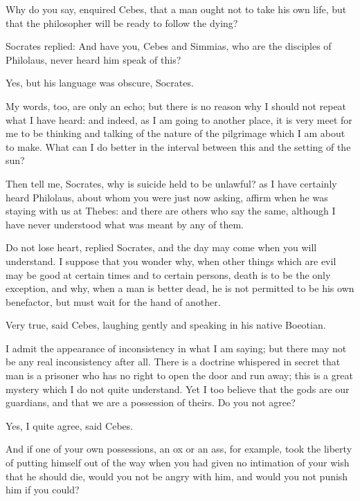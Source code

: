 \documentclass[11pt,letter]{article}
\begin{document}
\par  Why do you say, enquired Cebes, that a man ought not to take his own life, but that the philosopher will be ready to follow the dying?

\par  Socrates replied: And have you, Cebes and Simmias, who are the disciples of Philolaus, never heard him speak of this?

\par  Yes, but his language was obscure, Socrates.

\par  My words, too, are only an echo; but there is no reason why I should not repeat what I have heard: and indeed, as I am going to another place, it is very meet for me to be thinking and talking of the nature of the pilgrimage which I am about to make. What can I do better in the interval between this and the setting of the sun?

\par  Then tell me, Socrates, why is suicide held to be unlawful? as I have certainly heard Philolaus, about whom you were just now asking, affirm when he was staying with us at Thebes: and there are others who say the same, although I have never understood what was meant by any of them.

\par  Do not lose heart, replied Socrates, and the day may come when you will understand. I suppose that you wonder why, when other things which are evil may be good at certain times and to certain persons, death is to be the only exception, and why, when a man is better dead, he is not permitted to be his own benefactor, but must wait for the hand of another.

\par  Very true, said Cebes, laughing gently and speaking in his native Boeotian.

\par  I admit the appearance of inconsistency in what I am saying; but there may not be any real inconsistency after all. There is a doctrine whispered in secret that man is a prisoner who has no right to open the door and run away; this is a great mystery which I do not quite understand. Yet I too believe that the gods are our guardians, and that we are a possession of theirs. Do you not agree?

\par  Yes, I quite agree, said Cebes.

\par  And if one of your own possessions, an ox or an ass, for example, took the liberty of putting himself out of the way when you had given no intimation of your wish that he should die, would you not be angry with him, and would you not punish him if you could?
\end{document}
